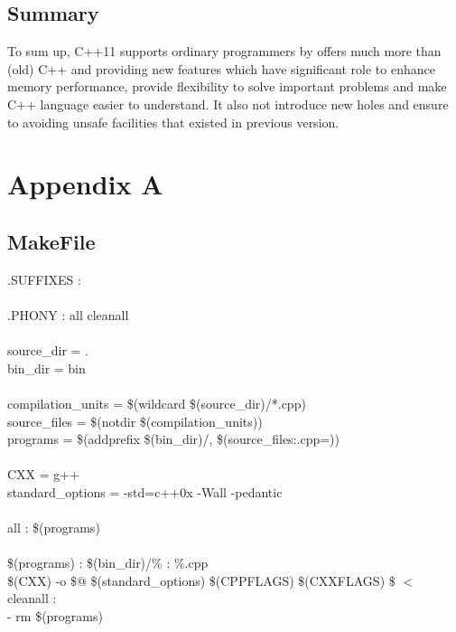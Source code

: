 \documentclass[12pt,a4paper]{report}
\begin{document}
\section{Summary}
\label{section: summary}

To sum up, C++11 supports ordinary programmers by offers much more than (old) C++  and  providing new features which have significant role to enhance memory performance, provide flexibility to solve important problems and make C++ language easier to understand. It also not introduce new holes and  ensure to avoiding unsafe facilities that existed in previous version.
\newpage


\label{References}

	

\newpage

\appendix
\chapter{Appendix A}
\section{MakeFile}
\label{Makefile}
.SUFFIXES : \\ \\
.PHONY : all cleanall \\ \\
source\_dir = .\\ 
bin\_dir = bin \\ \\
compilation\_units = \$(wildcard \$(source\_dir)/*.cpp)\\
source\_files = \$(notdir \$(compilation\_units))\\
programs = \$(addprefix \$(bin\_dir)/, \$(source\_files:.cpp=))\\ \\
CXX = g++ \\
standard\_options = -std=c++0x -Wall -pedantic \\ \\
all : \$(programs)\\ \\
\$(programs) : \$(bin\_dir)/\% : \%.cpp \\
\$(CXX) -o \$@ \$(standard\_options) \$(CPPFLAGS) \$(CXXFLAGS) \$ $<$ \\
\newline
cleanall : \\
- rm \$(programs)
\end{document}
